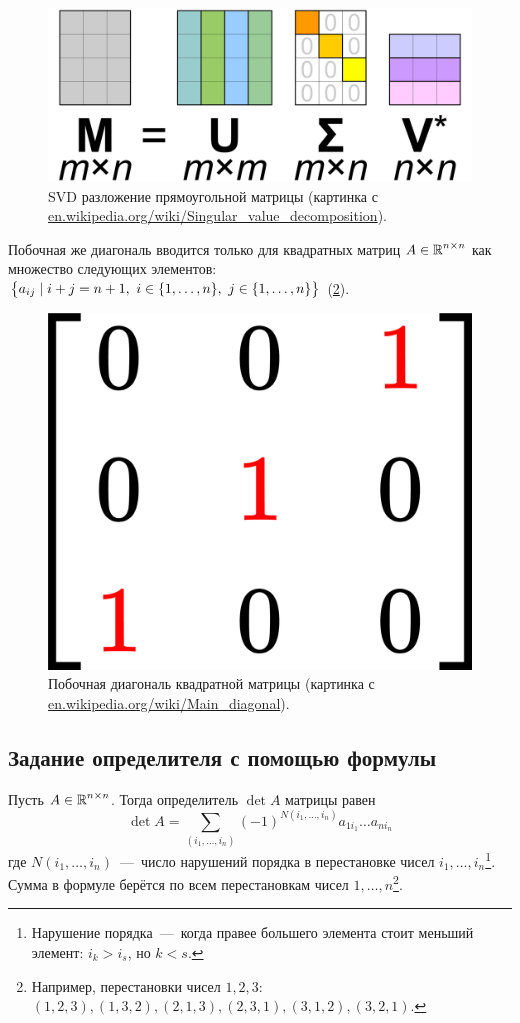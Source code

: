\documentclass[a4paper,12pt]{article}
\begin{document}
  \begin{figure}[h]
    \centering
    
    \includegraphics[width=0.5\columnwidth]{svd_reduced}  %
    
    \caption{SVD разложение прямоугольной матрицы (картинка с \href{https://commons.wikimedia.org/wiki/File:Singular\_value\_decomposition_visualisation.svg}{en.wikipedia.org/wiki/Singular\_value\_decomposition}).}
    \label{fig:svd_reduced}
  \end{figure}

  Побочная же диагональ вводится только для квадратных матриц $A \hm\in \RR^{n \hm\times n}$ как множество следующих элементов: $\bigl\{a_{ij} \hm\mid i \hm+ j \hm= n \hm+ 1,\ i \hm\in \{1, \ldots, n\},\ j \hm\in \{1, \ldots, n\}\bigr\}$ (\ref{fig:secondary-diagonal}).
  
  \begin{figure}[h]
    \centering
    
    \includegraphics[width=0.11\columnwidth]{secondary-diagonal}  %
    
    \caption{Побочная диагональ квадратной матрицы (картинка с \href{https://en.wikipedia.org/wiki/Main\_diagonal}{en.wikipedia.org/wiki/Main\_diagonal}).}
    \label{fig:secondary-diagonal}
  \end{figure}
  
  
  \subsection{Задание определителя с помощью формулы}
  
  \begin{theorem}\label{theor:complete-expansion}
    Пусть $A \in \operatorname{\mathbb R}^{n \times n}$.
    Тогда определитель $\det A$ матрицы равен
    \begin{equation}
      \label{eq:complete-expansion}
      \det A = \sum_{(i_1, \ldots, i_n)} (-1)^{N(i_1, \ldots, i_n)} a_{1 i_1} \ldots a_{n i_n}
    \end{equation}
    где $N(i_1, \ldots, i_n)$~---~число нарушений порядка в перестановке чисел $i_1, \ldots, i_n$\footnote{Нарушение порядка~---~когда правее большего элемента стоит меньший элемент: $i_k > i_s$, но $k < s$.}.
    Сумма в формуле берётся по всем перестановкам чисел $1, \ldots, n$\footnote{Например, перестановки чисел $1, 2, 3$: $(1, 2, 3), (1, 3, 2), (2, 1, 3), (2, 3, 1), (3, 1, 2), (3, 2, 1)$.}.
  \end{theorem}
  
\end{document}
